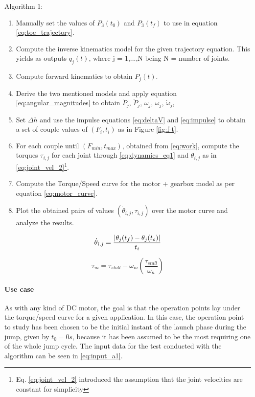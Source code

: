 Algorithm 1:
\begin{enumerate}
\label{list:algorithm_1}
\item Manually set the values of $P_{3}(t_{0})$ and $P_{3}(t_{f})$ to use in equation \ref{eq:toe_trajectory}.
\item Compute the inverse kinematics model for the given trajectory equation. This yields as outputs $q_{j}(t)$, where j = 1,...,N being N = number of joints.
\item Compute forward kinematics to obtain $P_{j}(t)$.
\item Derive the two mentioned models and apply equation \ref{eq:angular_magnitudes} to obtain $\dot{P}_{j}$, $\ddot{P}_{j}$, $\omega_{j}$, $\omega_{j}$, $\dot{\omega}_{j}$,
\item Set $\Delta h$ and use the impulse equations \ref{eq:deltaV} and \ref{eq:impulse} to obtain a set of couple values of $(F_{i}, t_{i})$ as in Figure \ref{fig:f-t}.
\item For each couple until $(F_{min}, t_{max})$, obtained from \ref{eq:work}, compute the torques $\tau_{i,j}$ for each joint through \ref{eq:dynamics_eq1} and $\theta_{i,j}$ as in \ref{eq:joint_vel_2}\footnote{Eq. \ref{eq:joint_vel_2} introduced the assumption that the joint velocities are constant for simplicity}.
\item Compute the Torque/Speed curve for the motor + gearbox model as per equation \ref{eq:motor_curve}.
\item Plot the obtained pairs of values $(\dot{\theta}_{i,j}, \tau_{i,j})$ over the motor curve and analyze the results.
\end{enumerate}

\begin{equation}
\label{eq:joint_vel_2}
	\dot{\theta}_{i,j} =\frac{ \lvert \theta_{j}(t_{f}) - \theta_{j}(t_{o}) \rvert }{ t_{i} }
\end{equation}

\begin{equation}
\label{eq:motor_curve}
	\tau_{m} = \tau_{stall} - \omega_{m}\left(\frac{\tau_{stall}}{\omega_{n}}\right)
\end{equation}

\paragraph{Use case} %
\label{par:example_of_use}
As with any kind of DC motor, the goal is that the operation points lay under the torque/speed curve for a given application.
In this case, the operation point to study has been chosen to be the initial instant of the launch phase during the jump, given by $t_{0}=0s$, because it has been assumed to be the most requiring one of the whole jump cycle.
The input data for the test conducted with the algorithm can be seen in \ref{eq:input_a1}.

